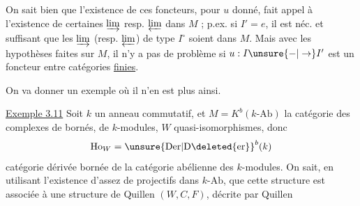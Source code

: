 On sait bien que l'existence de ces foncteurs,
pour $u$ donné, fait appel à l'existence de
certaines $\varinjlim$ resp. $\varprojlim$ dans $M$ ; p.ex. si
$I'=e$, il est néc. et suffisant que les $\varinjlim$
(resp. $\varprojlim$) de type $I^\circ$ soient  dans $M$.
Mais avec les hypothèses faites sur $M$, il
n'y a pas de problème si $u:I\unsure{-|\to}I'$ est
un foncteur entre catégories \uline{finies}.

On va donner un exemple où il n'en
est plus ainsi.

\uline{Exemple 3.11} Soit $k$ un anneau
commutatif, et  $M=K^b(k\text{-}\mathrm{Ab})$
la catégorie des complexes de 
bornés, de $k$-modules, $W$  
quasi-isomorphismes, donc
\[
 \mathrm{Ho}_W=\unsure{\mathrm{Der}|\mathrm{D}\deleted{\mathrm{er}}}^{b}(k)
\]
catégorie dérivée bornée de la catégorie
abélienne des $k$-modules. On sait,
en utilisant l'existence d'assez de
projectifs dans $k\text{-}\mathrm{Ab}$, que cette
structure est associée à une structure
de Quillen  $(W,C,F)$, décrite par Quillen
